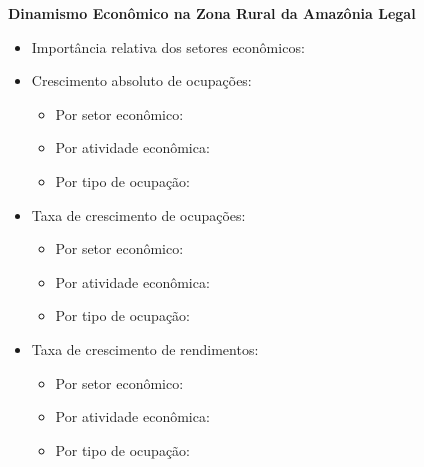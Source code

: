 \documentclass[10pt]{beamer}
\begin{document}
\begin{frame}[label=indice_principal_amz_rural]{}

\textit{\hyperlink{indice_principal}{}}

\textbf{Dinamismo Econômico na Zona Rural da Amazônia Legal}
\vspace{2mm}

\begin{itemize}

\item{Importância relativa dos setores econômicos: \hyperlink{_amz_rural_importancia_relativa}{}}
\vspace{1mm}

\item{Crescimento  absoluto de ocupações:
	\begin{itemize}
	\item{Por setor econômico: \hyperlink{amzruralrkngnocuporsetor}{}}
	\item{Por atividade econômica: \hyperlink{amzruralrkngnocuporatividade}{}}
	\item{Por tipo de ocupação: \hyperlink{amzruralrkngnocuporocupacao}{}}
	\end{itemize}
}
\vspace{1mm}

\item{Taxa de crescimento de ocupações:
	\begin{itemize}
	\item{Por setor econômico: \hyperlink{amzruralrkngtxocuporsetor}{}}
	\item{Por atividade econômica: \hyperlink{amzruralrkngtxocuporatividade}{}}
	\item{Por tipo de ocupação: \hyperlink{amzruralrkngtxocuporocupacao}{}}
	\end{itemize}
}
\vspace{1mm}

\item{Taxa de crescimento de rendimentos:
	\begin{itemize}
	\item{Por setor econômico: \hyperlink{amzruralrkngtxrendaporsetor}{}}
	\item{Por atividade econômica: \hyperlink{amzruralrkngtxrendaporatividade}{}}
	\item{Por tipo de ocupação: \hyperlink{amzruralrkngtxrendaporocupacao}{}}
	\end{itemize}
}
\vspace{1mm}

\end{itemize}

\end{frame}
\end{document}
